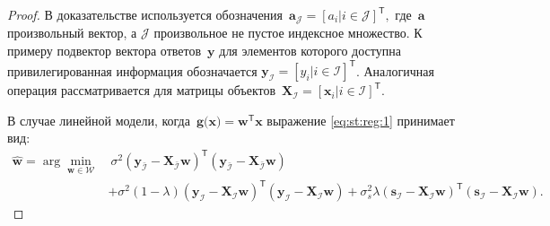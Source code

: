 \documentclass[12pt, twoside]{article}
\begin{document}
\begin{proof}
В доказательстве используется обозначения~$\mathbf{a}_{\mathcal{J}} = [a_i| i \in \mathcal{J}]^{\mathsf{T}},$ где~$\mathbf{a}$ произвольный вектор, а $\mathcal{J}$ произвольное не пустое индексное множество. К примеру подвектор вектора ответов~$\mathbf{y}$ для элементов которого доступна привилегированная информация обозначается $\mathbf{y}_{\mathcal{I}} = [y_i| i \in \mathcal{I}]^{\mathsf{T}}$. Аналогичная операция рассматривается для матрицы объектов~$\mathbf{X}_\mathcal{I}=[\mathbf{x}_{i}| i \in \mathcal{I}]^{\mathsf{T}}$.

В случае линейной модели, когда~$\mathbf{g}\bigr(\mathbf{x}\bigr) = \mathbf{w}^{\mathsf{T}}\mathbf{x}$ выражение \eqref{eq:st:reg:1} принимает вид:
\[
\label{eq:st:reg:2}
\begin{aligned}
\hat{\mathbf{w}} = \arg\min_{\mathbf{w}\in \mathcal{W}} &~ \sigma^2\left(\mathbf{y}_{\bar{\mathcal{I}}}-\mathbf{X}_{\bar{\mathcal{I}}}\mathbf{w}\right)^{\mathsf{T}}\left(\mathbf{y}_{\bar{\mathcal{I}}}-\mathbf{X}_{\bar{\mathcal{I}}}\mathbf{w}\right) \\
&+ \sigma^2\left(1-\lambda\right)\left(\mathbf{y}_{\mathcal{I}}-\mathbf{X}_{\mathcal{I}}\mathbf{w}\right)^{\mathsf{T}}\left(\mathbf{y}_{\mathcal{I}}-\mathbf{X}_{\mathcal{I}}\mathbf{w}\right) + \sigma^2_s\lambda\left(\mathbf{s}_{\mathcal{I}}-\mathbf{X}_{\mathcal{I}}\mathbf{w}\right)^{\mathsf{T}}\left(\mathbf{s}_{\mathcal{I}}-\mathbf{X}_{\mathcal{I}}\mathbf{w}\right).
\end{aligned}
\]


\end{proof}
\end{document}
